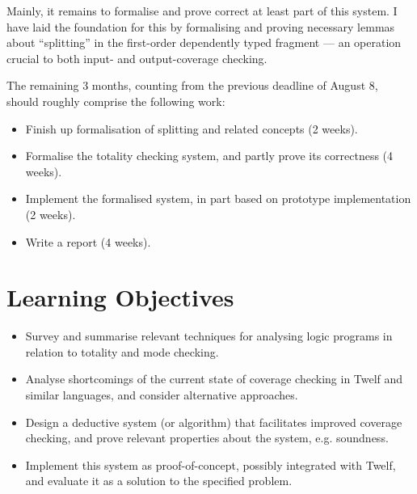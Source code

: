 \documentclass[12pt]{article}
\begin{document}
Mainly, it remains to formalise and prove correct at least part of this system.
I have laid the foundation for this by formalising and proving necessary lemmas about ``splitting'' in the first-order dependently typed fragment --- an operation crucial to both input- and output-coverage checking.

The remaining 3 months, counting from the previous deadline of August 8, should roughly comprise the following work:
\begin{itemize}
	\item Finish up formalisation of splitting and related concepts (2 weeks).
  \item Formalise the totality checking system, and partly prove its correctness (4 weeks).
  \item Implement the formalised system, in part based on prototype implementation (2 weeks).
  \item Write a report (4 weeks).
\end{itemize}

\section*{Learning Objectives}

\begin{itemize}
	\item Survey and summarise relevant techniques for analysing logic programs in relation to totality and mode checking.
  \item Analyse shortcomings of the current state of coverage checking in Twelf and similar languages, and consider alternative approaches.
  \item Design a deductive system (or algorithm) that facilitates improved coverage checking, and prove relevant properties about the system, e.g. soundness.
  \item Implement this system as proof-of-concept, possibly integrated with Twelf, and evaluate it as a solution to the specified problem.
\end{itemize}
\end{document}
